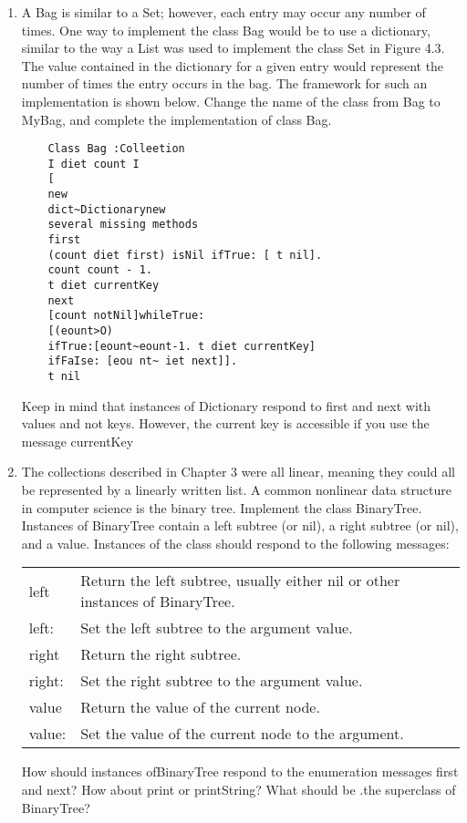 \begin{enumerate}

\item A Bag is similar to a Set; however, each entry may occur any number
of times. One way to implement the class Bag would be to use a
dictionary, similar to the way a List was used to implement the class
Set in Figure 4.3. The value contained in the dictionary for a given
entry would represent the number of times the entry occurs in the bag.
The framework for such an implementation is shown below. Change
the name of the class from Bag to MyBag, and complete the implementation of class Bag.
\begin{lstlisting}
    Class Bag :Colleetion
    I diet count I
    [
    new
    dict~Dictionarynew
    several missing methods
    first
    (count diet first) isNil ifTrue: [ t nil].
    count count - 1.
    t diet currentKey
    next
    [count notNil]whileTrue:
    [(eount>O)
    ifTrue:[eount~eount-1. t diet currentKey]
    ifFaIse: [eou nt~ iet next]].
    t nil
\end{lstlisting}
Keep in mind that instances of Dictionary respond to first and next
with values and not keys. However, the current key is accessible if you
use the message currentKey

\item The collections described in Chapter 3 were all linear, meaning they
could all be represented by a linearly written list. A common nonlinear
data structure in computer science is the binary tree. Implement the
class BinaryTree. Instances of BinaryTree contain a left subtree (or
nil), a right subtree (or nil), and a value. Instances of the class should
respond to the following messages:

\begin{tabular}{l p{8cm}}
    left & Return the left subtree, usually either nil or other instances of BinaryTree. \\
    left: & Set the left subtree to the argument value. \\
    right & Return the right subtree. \\
    right: & Set the right subtree to the argument value. \\
    value & Return the value of the current node. \\
    value: & Set the value of the current node to the argument. \\
\end{tabular}

\noindent
How should instances ofBinaryTree respond to the enumeration messages first and next? How about print or printString? What should be
.the superclass of BinaryTree?

\end{enumerate}